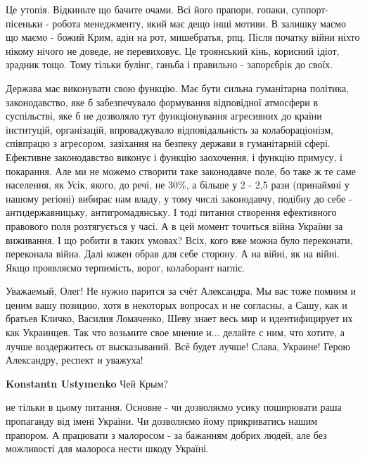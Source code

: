 \begin{itemize}
\begin{itemize}
\end{itemize} %


Це утопія. Відкиньте що бачите очами. Всі його прапори, гопаки,
суппорт-пісеньки - робота менеджменту, який має дещо інші мотиви. В залишку
маємо що маємо - божий Крим, адін на рот, мишебратья, рпц. Після початку війни
ніхто нікому нічого не доведе, не перевиховує. Це троянський кінь, корисний
ідіот, зрадник тощо. Тому тільки булінг, ганьба і правильно - запорєбрік до
своїх.


Держава має виконувати свою функцію. Має бути сильна гуманітарна політика,
законодавство, яке б забезпечувало формування відповідної атмосфери в
суспільстві, яке б не дозволяло тут функціонування агресивних до країни
інституцій, організацій, впроваджувало відповідальність за колабораціонізм,
співпрацю з агресором, зазіхання на безпеку держави в гуманітарній сфері.
Ефективне законодавство виконує і функцію заохочення, і функцію примусу, і
покарання. Але ми не можемо створити таке законодавче поле, бо таке ж те саме
населення, як Усік, якого, до речі, не 30\%, а більше у 2 - 2,5 рази (принаймні
у нашому регіоні) вибирає нам владу, у тому числі законодавчу, подібну до себе
- антидержавницьку, антигромадянську. І тоді питання створення ефективного
правового поля розтягується у часі. А в цей момент точиться війна України за
виживання. І що робити в таких умовах? Всіх, кого вже можна було переконати,
переконала війна. Далі кожен обрав для себе сторону. А на війні, як на війні.
Якщо проявляємо терпимість, ворог, колаборант нагліє.


Уважаемый, Олег! Не нужно парится за счёт Александра. Мы вас тоже помним и
ценим вашу позицию, хотя в некоторых вопросах и не согласны, а Сашу, как и
братьев Кличко, Василия Ломаченко, Шеву знает весь мир и идентифицирует их как
Украинцев. Так что возьмите свое мнение и... делайте с ним, что хотите, а лучше
воздержитесь от высказываний. Всё будет лучше! Слава, Украине! Герою
Александру, респект и уважуха!

\begin{itemize} %
\textbf{Konstantn Ustymenko} Чей Крым?
\end{itemize} %


не тільки в цьому питання. Основне - чи дозволяємо усику поширювати раша
пропаганду від імені України. Чи дозволяємо йому прикриватись нашим прапором. А
працювати з малоросом - за бажанням добрих людей, але без можливості для
малороса нести шкоду Україні.



\end{itemize}

